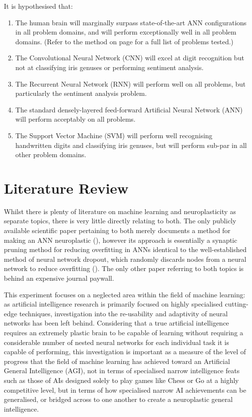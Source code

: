 \documentclass[]{report}
\begin{document}
It is hypothesised that:
\begin{enumerate}
	\item The human brain will marginally surpass state-of-the-art ANN configurations in all problem domains, and will perform exceptionally well in all problem domains. (Refer to the method on page \pageref{itm:Method} for a full list of problems tested.)
	\item The Convolutional Neural Network (CNN) will excel at digit recognition but not at classifying iris genuses or performing sentiment analysis.
	\item The Recurrent Neural Network (RNN) will perform well on all problems, but particularly the sentiment analysis problem.
	\item The standard densely-layered feed-forward Artificial Neural Network (ANN) will perform acceptably on all problems.
	\item The Support Vector Machine (SVM) will perform well recognising handwritten digits and classifying iris genuses, but will perform sub-par in all other problem domains.
\end{enumerate}

\section{Literature Review}

Whilst there is plenty of literature on machine learning and neuroplasticity as separate topics, there is very little directly relating to both. The only publicly available scientific paper pertaining to both merely documents a method for making an ANN neuroplastic (\cite{perwej12}), however its approach is essentially a synaptic pruning method for reducing overfitting in ANNs identical to the well-established method of neural network dropout, which randomly discards nodes from a neural network to reduce overfitting (\cite{dropout14}). The only other paper referring to both topics is behind an expensive journal paywall.

This experiment focuses on a neglected area within the field of machine learning: as artificial intelligence research is primarily focused on highly specialised cutting-edge techniques, investigation into the re-usability and adaptivity of neural networks has been left behind. Considering that a true artificial intelligence requires an extremely plastic brain to be capable of learning without requiring a considerable number of nested neural networks for each individual task it is capable of performing, this investigation is important as a measure of the level of progress that the field of machine learning has achieved toward an Artificial General Intelligence (AGI), not in terms of specialised narrow intelligence feats such as those of AIs designed solely to play games like Chess or Go at a highly competitive level, but in terms of how specialised narrow AI achievements can be generalised, or bridged across to one another to create a neuroplastic general intelligence.
\end{document}
